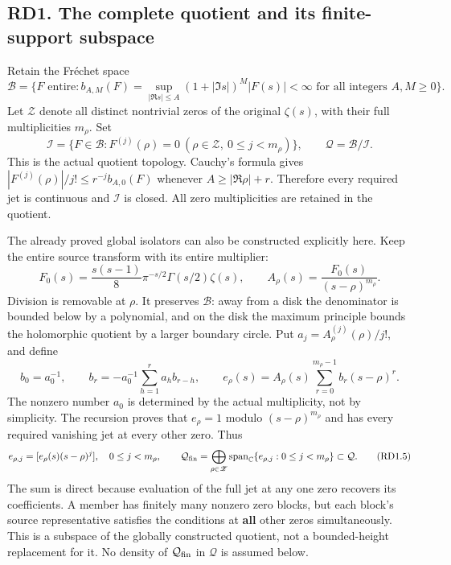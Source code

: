\subsection{RD1. The complete quotient and its finite-support
subspace}\label{rd1.-the-complete-quotient-and-its-finite-support-subspace}

Retain the Fréchet space \[
\mathcal B=\{F\text{ entire}:b_{A,M}(F)=
\sup_{|\Re s|\le A}(1+|\Im s|)^M|F(s)|<\infty
\text{ for all integers }A,M\ge0\}.
\tag{RD1.1}
\] Let \(\mathscr Z\) denote all distinct nontrivial zeros of the
original \(\zeta(s)\), with their full multiplicities \(m_\rho\). Set \[
\mathcal I=\{F\in\mathcal B:F^{(j)}(\rho)=0
\ (\rho\in\mathscr Z,\ 0\le j<m_\rho)\},\qquad
\mathcal Q=\mathcal B/\mathcal I.
\tag{RD1.2}
\] This is the actual quotient topology. Cauchy's formula gives
\(|F^{(j)}(\rho)|/j!\le r^{-j}b_{A,0}(F)\) whenever \(A\ge|\Re\rho|+r\).
Therefore every required jet is continuous and \(\mathcal I\) is closed.
All zero multiplicities are retained in the quotient.

The already proved global isolators can also be constructed explicitly
here. Keep the entire source transform with its entire multiplier: \[
F_0(s)=\frac{s(s-1)}8\pi^{-s/2}\Gamma(s/2)\zeta(s),\qquad
A_\rho(s)=\frac{F_0(s)}{(s-\rho)^{m_\rho}}.
\tag{RD1.3}
\] Division is removable at \(\rho\). It preserves \(\mathcal B\): away
from a disk the denominator is bounded below by a polynomial, and on the
disk the maximum principle bounds the holomorphic quotient by a larger
boundary circle. Put \(a_j=A_\rho^{(j)}(\rho)/j!\), and define \[
b_0=a_0^{-1},\qquad
b_r=-a_0^{-1}\sum_{h=1}^r a_hb_{r-h},\qquad
e_\rho(s)=A_\rho(s)\sum_{r=0}^{m_\rho-1}b_r(s-\rho)^r.
\tag{RD1.4}
\] The nonzero number \(a_0\) is determined by the actual multiplicity,
not by simplicity. The recursion proves that \(e_\rho=1\) modulo
\((s-\rho)^{m_\rho}\) and has every required vanishing jet at every
other zero. Thus \[
e_{\rho,j}=[e_\rho(s)(s-\rho)^j],\quad0\le j<m_\rho,
\qquad
\mathcal Q_{\rm fin}=\bigoplus_{\rho\in\mathscr Z}
\operatorname{span}_{\mathbb C}\{e_{\rho,j}:0\le j<m_\rho\}
\subset\mathcal Q.
\tag{RD1.5}
\] The sum is direct because evaluation of the full jet at any one zero
recovers its coefficients. A member has finitely many nonzero zero
blocks, but each block's source representative satisfies the conditions
at \textbf{all} other zeros simultaneously. This is a subspace of the
globally constructed quotient, not a bounded-height replacement for it.
No density of \(\mathcal Q_{\rm fin}\) in \(\mathcal Q\) is assumed
below.

